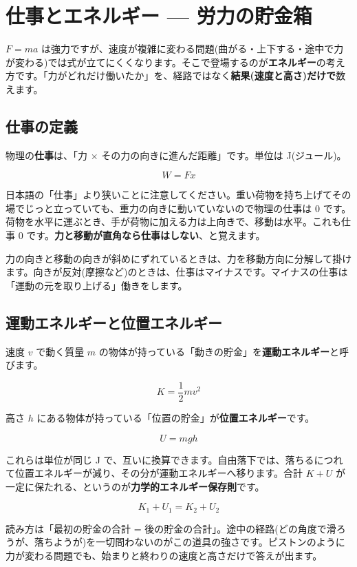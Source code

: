 \documentclass{article}
\begin{document}
\section{仕事とエネルギー — 労力の貯金箱}

\( F = ma \) は強力ですが、速度が複雑に変わる問題(曲がる・上下する・途中で力が変わる)では式が立てにくくなります。そこで登場するのが\textbf{エネルギー}の考え方です。「力がどれだけ働いたか」を、経路ではなく\textbf{結果(速度と高さ)だけで}数えます。

\subsection{仕事の定義}

物理の\textbf{仕事}は、「力 × その力の向きに進んだ距離」です。単位は J(ジュール)。

\[ W = Fx \]

日本語の「仕事」より狭いことに注意してください。重い荷物を持ち上げてその場でじっと立っていても、重力の向きに動いていないので物理の仕事は 0 です。荷物を水平に運ぶとき、手が荷物に加える力は上向きで、移動は水平。これも仕事 0 です。\textbf{力と移動が直角なら仕事はしない}、と覚えます。

力の向きと移動の向きが斜めにずれているときは、力を移動方向に分解して掛けます。向きが反対(摩擦など)のときは、仕事はマイナスです。マイナスの仕事は「運動の元を取り上げる」働きをします。

\subsection{運動エネルギーと位置エネルギー}

速度 \( v \) で動く質量 \( m \) の物体が持っている「動きの貯金」を\textbf{運動エネルギー}と呼びます。

\[ K = \frac{1}{2} m v^{2} \]

高さ \( h \) にある物体が持っている「位置の貯金」が\textbf{位置エネルギー}です。

\[ U = mgh \]

これらは単位が同じ J で、互いに換算できます。自由落下では、落ちるにつれて位置エネルギーが減り、その分が運動エネルギーへ移ります。合計 \( K + U \) が一定に保たれる、というのが\textbf{力学的エネルギー保存則}です。

\[ K_{1} + U_{1} = K_{2} + U_{2} \]

読み方は「最初の貯金の合計 = 後の貯金の合計」。途中の経路(どの角度で滑ろうが、落ちようが)を一切問わないのがこの道具の強さです。ピストンのように力が変わる問題でも、始まりと終わりの速度と高さだけで答えが出ます。
\end{document}
